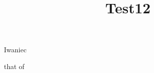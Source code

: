 \documentclass[reqno]{amsart} 
\title{Test12}
\begin{document}
Iwaniec \cite{Iwaniec1992}

that of \cite[\S5.1.4]{michel-2009}



{} 
\end{document}
